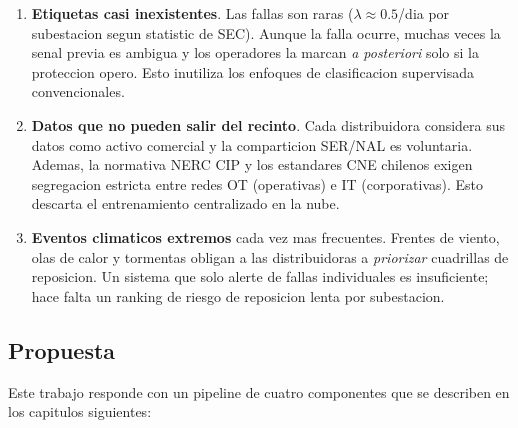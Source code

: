 \begin{enumerate}[leftmargin=*,itemsep=4pt]
  \item \textbf{Etiquetas casi inexistentes}. Las fallas son raras
        ($\lambda \approx 0.5$/dia por subestacion segun statistic de SEC).
        Aunque la falla ocurre, muchas veces la senal previa es ambigua
        y los operadores la marcan \emph{a posteriori} solo si la
        proteccion opero. Esto inutiliza los enfoques de clasificacion
        supervisada convencionales.

  \item \textbf{Datos que no pueden salir del recinto}. Cada
        distribuidora considera sus datos como activo comercial y la
        comparticion SER/NAL es voluntaria. Ademas, la normativa
        NERC CIP y los estandares CNE chilenos exigen segregacion
        estricta entre redes OT (operativas) e IT (corporativas).
        Esto descarta el entrenamiento centralizado en la nube.

  \item \textbf{Eventos climaticos extremos} cada vez mas frecuentes.
        Frentes de viento, olas de calor y tormentas obligan a las
        distribuidoras a \emph{priorizar} cuadrillas de reposicion.
        Un sistema que solo alerte de fallas individuales es
        insuficiente; hace falta un ranking de riesgo de
        reposicion lenta por subestacion.
\end{enumerate}

\subsection{Propuesta}

Este trabajo responde con un pipeline de cuatro componentes que se
describen en los capitulos siguientes:

